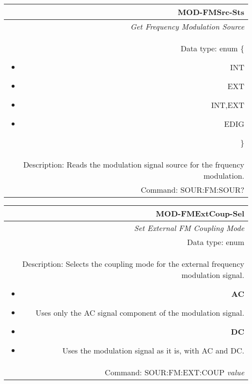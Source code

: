 \documentclass[openany]{article}
\begin{document}
		\begin{tabular}{N}
			\hline
			\bfseries MOD-FMSrc-Sts \\ \hline
			\emph{Get Frequency Modulation Source} \\
			Data type: enum \{\begin{itemize}[noitemsep]
				\small
				\item[] INT
				\item[] EXT
				\item[] INT,EXT
				\item[] EDIG
			\end{itemize}\} \\ 
			Description: Reads the modulation signal source for the frquency modulation. \\
			Command: SOUR:FM:SOUR? \\

		\end{tabular}
%
		\begin{tabular}{N}
			\hline
			\bfseries MOD-FMExtCoup-Sel \\ \hline
			\emph{Set External FM Coupling Mode} \\
			Data type: enum \\  
			Description: Selects the coupling mode for the external frequency modulation signal.\begin{itemize}[noitemsep]
				\small
				\item[] \textbf{AC}
				\item[] Uses only the AC signal component of the modulation signal.
				\item[] \textbf{DC}
				\item[] Uses the modulation signal as it is, with AC and DC.	
			\end{itemize} \\
			Command: SOUR:FM:EXT:COUP \emph{value} \\

		\end{tabular}
\end{document}
